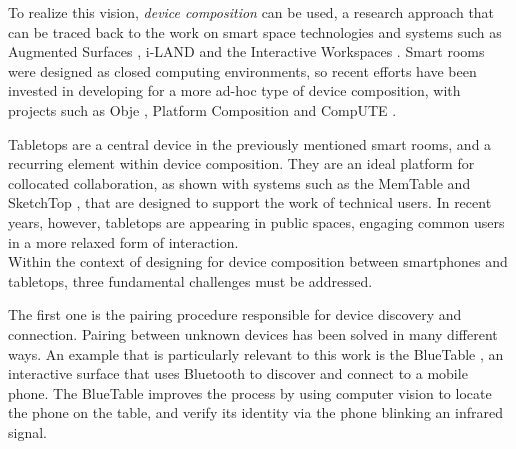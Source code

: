 To realize this vision, \emph{device composition} can be used, a research approach that can be traced back to the work on smart space technologies and systems such as Augmented Surfaces \citep{Rekimoto:1999:augmentedsurfaces}, \mbox{i-LAND} \citep{Streitz:1999:iland} and the Interactive Workspaces \citep{Johanson:2002:iroom}.
Smart rooms were designed as closed computing environments, so recent efforts have been invested in developing for a more ad-hoc type of device composition, with projects such as Obje \citep{Edwards:2009:obje}, Platform Composition \citep{Pering:2009:platformcomp} and CompUTE \citep{Bardram:2010:compute}.

Tabletops are a central device in the previously mentioned smart rooms, and a recurring element within device composition.
They are an ideal platform for collocated collaboration, as shown with systems such as the MemTable \citep{Hunter:2011:memtable} and SketchTop \citep{Clifton:2010:sketchtop}, that are designed to support the work of technical users.
In recent years, however, tabletops are appearing in public spaces, engaging common users in a more relaxed form of interaction.
\\
\linebreak
Within the context of designing for device composition between smartphones and tabletops, three fundamental challenges must be addressed.

The first one is the pairing procedure responsible for device discovery and connection.
Pairing between unknown devices has been solved in many different ways.
An example that is particularly relevant to this work is the BlueTable \citep{Wilson:2007:bluetable}, an interactive surface that uses Bluetooth to discover and connect to a mobile phone.
The BlueTable improves the process by using computer vision to locate the phone on the table, and verify its identity via the phone blinking an infrared signal.

